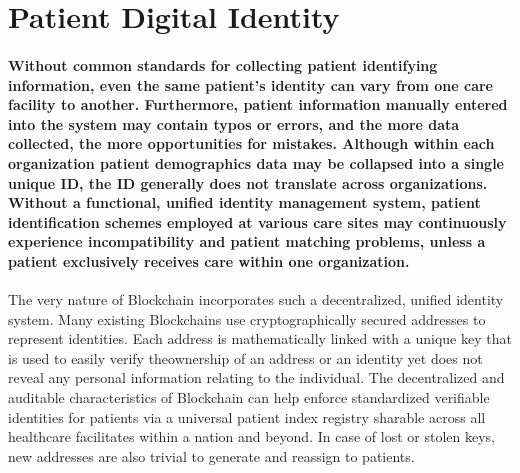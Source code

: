 \documentclass[12pt]{report}
\begin{document}
\section{Patient Digital Identity}
\paragraph{Without common standards for collecting patient identifying information, even the
same patient’s identity can vary from one care facility to another.  Furthermore, patient information manually
entered into the system may contain typos or errors, and the more data collected, the more
opportunities for mistakes. Although within each organization patient demographics data
may be collapsed into a single unique ID, the ID generally does not translate across organizations.
Without a functional, unified identity management system, patient identification
schemes employed at various care sites may continuously experience incompatibility and patient matching problems, unless a patient exclusively receives care within one organization.}
\par
The very nature of Blockchain incorporates such a decentralized, unified identity system. Many existing Blockchains use cryptographically secured addresses to represent identities. Each address is mathematically linked with a unique key that is used to easily verify theownership of an address or an identity yet does not reveal any personal information relating
to the individual. The decentralized and auditable characteristics of Blockchain can help enforce standardized verifiable identities for patients via a universal patient index registry sharable across all healthcare facilitates within a nation and beyond. In case of lost or stolen keys, new addresses are also trivial to generate and reassign to patients.
\end{document}
